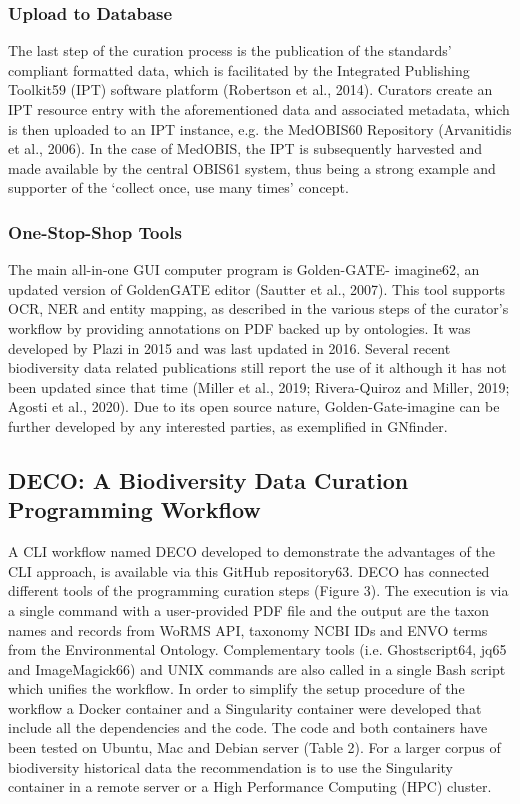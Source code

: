    \subsubsection{Upload to Database}
   The last step of the curation process is the publication of the standards’ compliant formatted data, which is facilitated by the Integrated Publishing Toolkit59 (IPT) software platform (Robertson et al., 2014).
Curators create an IPT resource entry with the aforementioned data and associated metadata, which is then uploaded to an IPT instance, e.g. the MedOBIS60 Repository (Arvanitidis et al., 2006). In the case of MedOBIS, the IPT is subsequently harvested and made available by the central OBIS61 system, thus being a strong example and supporter of the ‘collect once, use many times’ concept.

   \subsubsection{One-Stop-Shop Tools}
   The main all-in-one GUI computer program is Golden-GATE- imagine62, an updated version of GoldenGATE editor (Sautter et al., 2007). This tool supports OCR, NER and entity mapping, as described in the various steps of the curator’s workflow by providing annotations on PDF backed up by ontologies. It was developed by Plazi in 2015 and was last updated in 2016. Several recent biodiversity data related publications still report the use of it although it has not been updated since that time (Miller et al., 2019; Rivera-Quiroz and Miller, 2019; Agosti et al., 2020). Due to its open source nature, Golden-Gate-imagine can be further developed by any interested parties, as exemplified in GNfinder.

   \subsection{DECO: A Biodiversity Data Curation Programming Workflow}
   A CLI workflow named DECO developed to demonstrate the advantages of the CLI approach, is available via this GitHub repository63. DECO has connected different tools of the programming curation steps (Figure 3). The execution is via a single command with a user-provided PDF file and the output are the taxon names and records from WoRMS API, taxonomy NCBI IDs and ENVO terms from the Environmental Ontology. Complementary tools (i.e. Ghostscript64, jq65 and ImageMagick66) and UNIX commands are also called in a single Bash script which unifies the workflow. In order to simplify the setup procedure of the workflow a Docker container and a Singularity container were developed that include all the dependencies and the code. The code and both containers have been tested on Ubuntu, Mac and Debian server (Table 2). For a larger corpus of biodiversity historical data the recommendation is to use the Singularity container in a remote server or a High Performance Computing (HPC) cluster.

